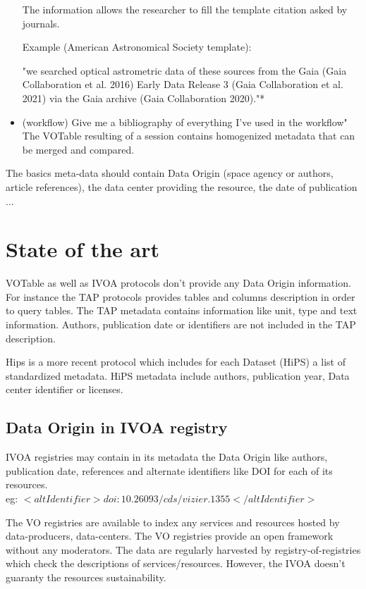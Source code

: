 \documentclass[11pt,a4paper]{ivoa}
\begin{document}
\begin{itemize}
	The information allows the researcher to fill the template citation asked by journals.
	
	Example (American Astronomical Society template):
	
	"we searched optical astrometric data of these sources from the Gaia (Gaia Collaboration et al. 2016) Early Data Release 3 (Gaia Collaboration et al. 2021) via the Gaia archive (Gaia Collaboration 2020)."*
	
	\item (workflow) Give me a bibliography of everything I've used in the workflow"
	The VOTable resulting of a session contains homogenized metadata that can be merged and compared.
	
\end{itemize}

The basics meta-data should contain Data Origin (space agency or authors, article references), the data center providing the resource, the date of publication ...

\section{State of the art}

VOTable as well as IVOA protocols don't provide any Data Origin information. For instance the TAP protocols provides tables and columns description in order to query tables. The TAP metadata contains information like unit, type and text information. Authors, publication date or identifiers are not included in the TAP description.

Hips is a more recent protocol which includes for each Dataset (HiPS) a list of standardized metadata. HiPS metadata include authors, publication year, Data center identifier or licenses.


\subsection{Data Origin in IVOA registry}
IVOA registries may contain in its metadata the Data Origin like authors, publication date, references and alternate identifiers like DOI for each of its resources.\\
eg: $<altIdentifier>doi:10.26093/cds/vizier.1355</altIdentifier>$

The VO registries are available to index any services and resources hosted by data-producers, data-centers. 
The VO registries provide an open framework without any moderators. The data are regularly harvested by registry-of-registries which check the descriptions of services/resources. However, the IVOA  doesn't guaranty the resources sustainability.
\end{document}
